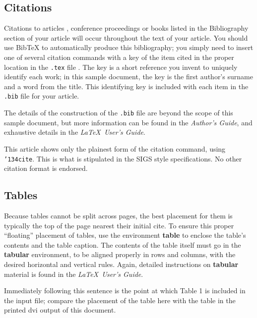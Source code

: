 \documentclass{acm_proc_article-sp}
\begin{document}
\subsection{Citations}
Citations to articles \cite{bowman:reasoning, clark:pct, braams:babel, herlihy:methodology},
conference
proceedings \cite{clark:pct} or books \cite{salas:calculus, Lamport:LaTeX} listed
in the Bibliography section of your
article will occur throughout the text of your article.
You should use BibTeX to automatically produce this bibliography;
you simply need to insert one of several citation commands with
a key of the item cited in the proper location in
the \texttt{.tex} file \cite{Lamport:LaTeX}.
The key is a short reference you invent to uniquely
identify each work; in this sample document, the key is
the first author's surname and a
word from the title.  This identifying key is included
with each item in the \texttt{.bib} file for your article.

The details of the construction of the \texttt{.bib} file
are beyond the scope of this sample document, but more
information can be found in the \textit{Author's Guide},
and exhaustive details in the \textit{\LaTeX\ User's
Guide}\cite{Lamport:LaTeX}.

This article shows only the plainest form
of the citation command, using \texttt{{\char'134}cite}.
This is what is stipulated in the SIGS style specifications.
No other citation format is endorsed.

\subsection{Tables}
Because tables cannot be split across pages, the best
placement for them is typically the top of the page
nearest their initial cite.  To
ensure this proper ``floating'' placement of tables, use the
environment \textbf{table} to enclose the table's contents and
the table caption.  The contents of the table itself must go
in the \textbf{tabular} environment, to
be aligned properly in rows and columns, with the desired
horizontal and vertical rules.  Again, detailed instructions
on \textbf{tabular} material
is found in the \textit{\LaTeX\ User's Guide}.

Immediately following this sentence is the point at which
Table 1 is included in the input file; compare the
placement of the table here with the table in the printed
dvi output of this document.
\end{document}
